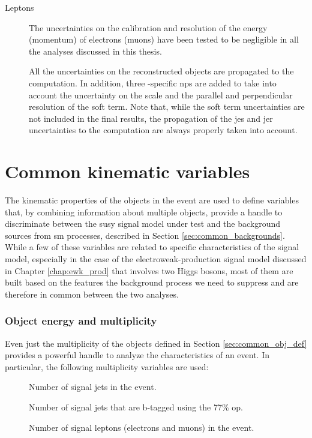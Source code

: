 \begin{description}
\item[Leptons] The uncertainties on the calibration and resolution of the energy (momentum) of electrons (muons) have been tested to be negligible in all the analyses discussed in this 
thesis. 

\item[\met] All the uncertainties on the reconstructed objects are propagated to the \met computation. In addition, three \met-specific \glspl{np} are added to take into
account the uncertainty on the scale and the parallel and perpendicular resolution of the \met soft term. Note that, while the \met soft term uncertainties are not included in the final results, 
the propagation of the \gls{jes} and \gls{jer} uncertainties to the \met computation 
are always properly taken into account.

\end{description}


\section{Common kinematic variables}
\label{sec:common_variables}

The kinematic properties of the objects in the event are used to define variables that, by combining information about multiple objects, 
provide a handle to discriminate between the \gls{susy} signal model under test and the background sources from \gls{sm} processes, described in Section \ref{sec:common_backgrounds}. 
While a few of these variables are related to specific characteristics of the signal model, especially in the case of the electroweak-production signal model discussed in Chapter \ref{chap:ewk_prod} that involves two Higgs bosons, most of them are built based on the features the 
background process we need to suppress and are therefore in common between the two analyses. 

\subsubsection*{Object energy and multiplicity}

Even just the multiplicity of the objects defined in Section \ref{sec:common_obj_def} provides a powerful handle to analyze the characteristics of an event. In particular, the following multiplicity variables are used:

\begin{description}
\item[\njet] Number of signal jets in the event.
\item[\nbjet] Number of signal jets that are b-tagged using the 77\% \gls{op}.
\item[\nlep] Number of signal leptons (electrons and muons) in the event.
\end{description}

